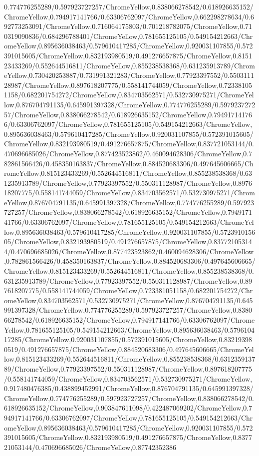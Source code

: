 {\begin{tikzternal}
{0.774776255289/0.597923727257/ChromeYellow,0.838066278542/0.618926635152/ChromeYellow,0.794917141766/0.63306762097/ChromeYellow,0.662298278634/0.692773253091/ChromeYellow,0.716064175803/0.701218782075/ChromeYellow,0.710319090836/0.684296788401/ChromeYellow,0.781655125105/0.549154212663/ChromeYellow,0.895636038463/0.579610417285/ChromeYellow,0.920031107855/0.572391015605/ChromeYellow,0.832193980519/0.491276657875/ChromeYellow,0.815123433269/0.552644516811/ChromeYellow,0.855238538368/0.631235913789/ChromeYellow,0.730420253887/0.731991321283/ChromeYellow,0.77923397552/0.550311128987/ChromeYellow,0.897618207775/0.558141744059/ChromeYellow,0.723381051158/0.682201754272/ChromeYellow,0.834703562571/0.532730975271/ChromeYellow,0.876704791135/0.645991397328/ChromeYellow,0.774776255289/0.597923727257/ChromeYellow,0.838066278542/0.618926635152/ChromeYellow,0.794917141766/0.63306762097/ChromeYellow,0.781655125105/0.549154212663/ChromeYellow,0.895636038463/0.579610417285/ChromeYellow,0.920031107855/0.572391015605/ChromeYellow,0.832193980519/0.491276657875/ChromeYellow,0.837721053144/0.470696685026/ChromeYellow,0.877423523862/0.460094628306/ChromeYellow,0.782861566426/0.458350163837/ChromeYellow,0.884520683306/0.497645606665/ChromeYellow,0.815123433269/0.552644516811/ChromeYellow,0.855238538368/0.631235913789/ChromeYellow,0.77923397552/0.550311128987/ChromeYellow,0.897618207775/0.558141744059/ChromeYellow,0.834703562571/0.532730975271/ChromeYellow,0.876704791135/0.645991397328/ChromeYellow,0.774776255289/0.597923727257/ChromeYellow,0.838066278542/0.618926635152/ChromeYellow,0.794917141766/0.63306762097/ChromeYellow,0.781655125105/0.549154212663/ChromeYellow,0.895636038463/0.579610417285/ChromeYellow,0.920031107855/0.572391015605/ChromeYellow,0.832193980519/0.491276657875/ChromeYellow,0.837721053144/0.470696685026/ChromeYellow,0.877423523862/0.460094628306/ChromeYellow,0.782861566426/0.458350163837/ChromeYellow,0.884520683306/0.497645606665/ChromeYellow,0.815123433269/0.552644516811/ChromeYellow,0.855238538368/0.631235913789/ChromeYellow,0.77923397552/0.550311128987/ChromeYellow,0.897618207775/0.558141744059/ChromeYellow,0.723381051158/0.682201754272/ChromeYellow,0.834703562571/0.532730975271/ChromeYellow,0.876704791135/0.645991397328/ChromeYellow,0.774776255289/0.597923727257/ChromeYellow,0.838066278542/0.618926635152/ChromeYellow,0.794917141766/0.63306762097/ChromeYellow,0.781655125105/0.549154212663/ChromeYellow,0.895636038463/0.579610417285/ChromeYellow,0.920031107855/0.572391015605/ChromeYellow,0.832193980519/0.491276657875/ChromeYellow,0.884520683306/0.497645606665/ChromeYellow,0.815123433269/0.552644516811/ChromeYellow,0.855238538368/0.631235913789/ChromeYellow,0.77923397552/0.550311128987/ChromeYellow,0.897618207775/0.558141744059/ChromeYellow,0.834703562571/0.532730975271/ChromeYellow,0.917480476385/0.438899452991/ChromeYellow,0.876704791135/0.645991397328/ChromeYellow,0.774776255289/0.597923727257/ChromeYellow,0.838066278542/0.618926635152/ChromeYellow,0.903847611098/0.422487069202/ChromeYellow,0.794917141766/0.63306762097/ChromeYellow,0.781655125105/0.549154212663/ChromeYellow,0.895636038463/0.579610417285/ChromeYellow,0.920031107855/0.572391015605/ChromeYellow,0.832193980519/0.491276657875/ChromeYellow,0.837721053144/0.470696685026/ChromeYellow,0.87742352386}
\end{tikzternal}}
